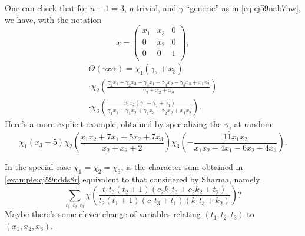 \documentclass[reqno]{amsart} 
\begin{document}
\begin{example}\label{example:cj59ndds8r}
  One can check that for $n+1=3$, $\eta$ trivial, and $\gamma$ ``generic'' as in \eqref{eq:cj59nab7hw}, we have, with the notation
  \begin{equation*}
x =
\begin{pmatrix}
x_1 & x_3 & 0 \\
0 & x_2 & 0 \\
0 & 0 & 1 \\
\end{pmatrix},
\end{equation*}
  \begin{multline*}
    \Theta(\gamma x \alpha) =
    \chi_1 \left(
      \gamma_{3} + x_{3}
    \right)
    \\ \cdot 
    \chi_2 \left(
      \frac{\gamma_{2} x_{1} + \gamma_{2} x_{3} - \gamma_{3} x_{1} - \gamma_{3} x_{2} - \gamma_{3} x_{3} + x_{1} x_{2}}{\gamma_{2} + x_{2} + x_{3}}
    \right)
    \\ \cdot 
    \chi_3
    \left(
      \frac{x_{1} x_{2} (\gamma_{1} - \gamma_{2} + \gamma_{3})}{\gamma_{1} x_{1} + \gamma_{1} x_{2} + \gamma_{1} x_{3} - \gamma_{2} x_{2} + x_{1} x_{2}}
    \right).
  \end{multline*}
  Here's a more explicit example, obtained by specializing the $\gamma_j$ at random:
  \begin{equation*}
\chi_1 \left(
    x_{3} - 5
  \right)
  \chi_2 \left(
    \frac{x_{1} x_{2} + 7 x_{1} + 5 x_{2} + 7 x_{3}}{x_{2} + x_{3} + 2}\right)
  \chi_3 \left(
  - \frac{11 x_{1} x_{2}}{x_{1} x_{2} - 4 x_{1} - 6 x_{2} - 4 x_{3}}\right).
\end{equation*}
\end{example}

\begin{question}
  In the special case $\chi_1 = \chi_2 = \chi_3$, is the character sum obtained in \ref{example:cj59ndds8r} equivalent to that considered by Sharma, namely
  \begin{equation*}
    \sum_{t_1, t_2, t_3 }
    \chi \left( \frac{t_{1} t_{3} (t_{2} + 1) (c_{2} k_{1} t_{3} + c_{2} k_{2} + t_{2})}{t_{2} (t_{1} + 1) (c_{1} t_{3} + t_{1}) (k_{1} t_{3} + k_{2})} \right)?
  \end{equation*}
  Maybe there's some clever change of variables relating $(t_1, t_2 , t_3 )$ to $(x_1 , x_2 , x_3 )$.
\end{question}




\end{document}
